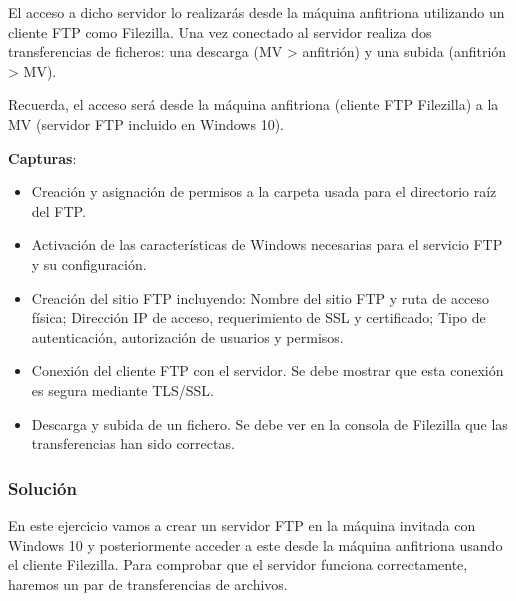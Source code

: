 El acceso a dicho servidor lo realizarás desde la máquina anfitriona utilizando un cliente FTP como Filezilla. Una vez conectado al servidor realiza dos transferencias de ficheros: una descarga (MV > anfitrión) y una subida (anfitrión > MV).

Recuerda, el acceso será desde la máquina anfitriona (cliente FTP Filezilla) a la MV (servidor FTP incluido en Windows 10).

\textbf{Capturas}:

\begin{itemize}
    \item Creación y asignación de permisos a la carpeta usada para el directorio raíz del FTP.
    \item Activación de las características de Windows necesarias para el servicio FTP y su configuración.
    \item Creación del sitio FTP incluyendo: Nombre del sitio FTP y ruta de acceso física; Dirección IP de acceso, requerimiento de SSL y certificado; Tipo de autenticación, autorización de usuarios y permisos.
    \item Conexión del cliente FTP con el servidor. Se debe mostrar que esta conexión es segura mediante TLS/SSL.
    \item Descarga y subida de un fichero. Se debe ver en la consola de Filezilla que las transferencias han sido correctas.
\end{itemize}

\subsubsection{Solución}

En este ejercicio vamos a crear un servidor FTP en la máquina invitada con Windows 10 y posteriormente acceder a este desde la máquina anfitriona usando el cliente Filezilla. Para comprobar que el servidor funciona correctamente, haremos un par de transferencias de archivos.

